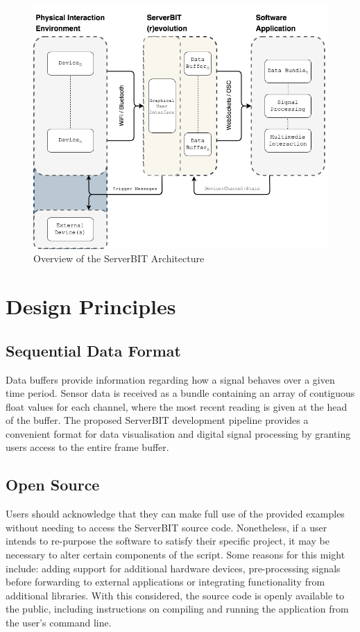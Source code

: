 \begin{figure}[ht]
  \centering
    \includegraphics[width=\textwidth]{Chapters/Figures/technical/ServerBIT/ServerBIT_Archietecture_EXT.png}
    \caption{Overview of the ServerBIT Architecture}
    \label{fig:diagram1}
\end{figure}

\section{Design Principles}

\subsection{Sequential Data Format}
Data buffers provide information regarding how a signal behaves over a given time period. Sensor data is received as a bundle containing an array of contiguous float values for each channel, where the most recent reading is given at the head of the buffer. The proposed ServerBIT development pipeline provides a convenient format for data visualisation and digital signal processing by granting users access to the entire frame buffer.

\subsection{Open Source}
Users should acknowledge that they can make full use of the provided examples without needing to access the ServerBIT source code. Nonetheless, if a user intends to re-purpose the software to satisfy their specific project, it may be necessary to alter certain components of the script. Some reasons for this might include: adding support for additional hardware devices, pre-processing signals before forwarding to external applications or integrating functionality from additional libraries. With this considered, the source code is openly available to the public, including instructions on compiling and running the application from the user's command line.

